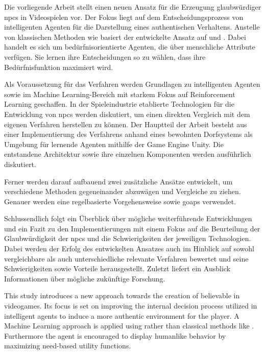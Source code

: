 Die vorliegende Arbeit stellt einen neuen Ansatz für die Erzeugung glaubwürdiger \acp{npc} in Videospielen vor. Der Fokus liegt auf dem Entscheidungsprozess von intelligenten Agenten für die Darstellung eines authentischen Verhaltens. Anstelle von klassischen Methoden wie  basiert der entwickelte Ansatz auf  und . Dabei handelt es sich um  bedürfnisorientierte Agenten, die über menschliche Attribute verfügen. Sie lernen ihre Entscheidungen so zu wählen, dass ihre Bedürfnisfunktion maximiert wird.

Als Voraussetzung für das Verfahren werden Grundlagen zu intelligenten Agenten sowie im Machine Learning-Bereich mit starkem Fokus auf Reinforcement Learning geschaffen. In der Spieleindustrie etablierte Technologien für die Entwicklung von \acp{npc} werden diskutiert, um einen direkten Vergleich mit dem eigenen Verfahren herstellen zu können.
Der Hauptteil der Arbeit besteht aus einer Implementierung des Verfahrens anhand eines bewohnten Dorfsystems als Umgebung für lernende Agenten mithilfe der Game Engine Unity. Die entstandene Architektur sowie ihre einzelnen Komponenten werden ausführlich diskutiert.

Ferner werden darauf aufbauend zwei zusätzliche Ansätze entwickelt, um verschiedene Methoden gegeneinander abzuwägen und Vergleiche zu ziehen. Genauer werden eine regelbasierte Vorgehensweise sowie \acp{goap} verwendet.

Schlussendlich folgt ein Überblick über mögliche weiterführende Entwicklungen und ein Fazit zu den Implementierungen mit einem Fokus auf die Beurteilung der Glaubwürdigkeit der \acp{npc} und die Schwierigkeiten der jeweiligen Technologien. Dabei werden der Erfolg des entwickelten Ansatzes auch im Hinblick auf sowohl vergleichbare als auch unterschiedliche relevante Verfahren bewertet und seine Schwierigkeiten sowie Vorteile herausgestellt. Zuletzt liefert ein Ausblick Informationen über mögliche zukünftige Forschung.




\newpage




This study introduces a new approach towards the creation of believable  in videogames. Its focus is set on improving the internal decision process utilized in intelligent agents to induce a more authentic environment for the player. A Machine Learning approach is applied using  rather than classical methods like . Furthermore the agent is encouraged to display humanlike behavior by maximizing need-based utility functions.

